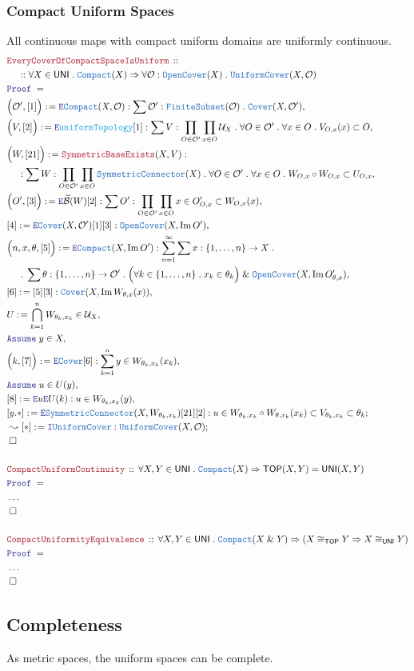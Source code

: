 \documentclass[12pt]{scrartcl}
\newcommand{\TYPE}[1]{\textcolor{NavyBlue}{\mathtt{#1}}}
\newcommand{\FUNC}[1]{\textcolor{Cerulean}{\mathtt{#1}}}
\newcommand{\LOGIC}[1]{\textcolor{Blue}{\mathtt{#1}}}
\newcommand{\THM}[1]{\textcolor{Maroon}{\mathtt{#1}}}
\renewcommand{\.}{\; . \;}
\newcommand{\de}{: \kern 0.1pc =}
\newcommand{\Theorem}[2]{& \THM{#1} \, :: \, #2 \\ & \Proof = \\ }
\newcommand{\NewLine}{\\ & \kern 1pc}
\newcommand{\Page}[1]{ \begin{align*} #1 \end{align*}   }
\newcommand{\NoProof}{ & \ldots \\ \EndProof}
\renewcommand{\And}{\; \& \;}
\newcommand{\Imply}{\Rightarrow}
\DeclareMathOperator*{\im}{Im}
\newcommand{\Finites}{\TYPE{FiniteSubset}}
\newcommand{\Cover}{\TYPE{Cover}}
\newcommand{\Say}[3]{& #1 \de #2 : #3, \\}
\newcommand{\SayIn}[3]{& #1 \de #2 \in #3, \\}
\newcommand{\Conclude}[3]{& #1 \de #2 : #3; \\}
\newcommand{\DeriveConclude}[3]{& \leadsto #1 \de #2 : #3 ; \\}
\newcommand{\AssumeIn}[2]{& \LOGIC{Assume} \; #1 \in #2, \\}
\newcommand{\Intro}{\LOGIC{I}}
\newcommand{\Elim}{\LOGIC{E}}
\newcommand{\QED}{\; \square}
\newcommand{\EndProof}{& \QED \\}
\newcommand{\Proof}{\LOGIC{Proof} \; }
\newcommand{\Compact}{\TYPE{Compact}}
\newcommand{\OpenC}{\TYPE{OpenCover}}
\newcommand{\TOP}{\mathsf{TOP}}
\renewcommand{\U}{\mathcal{U}}
\renewcommand{\O}{\mathcal{O}}
\newcommand{\UNI}{\mathsf{UNI}}
\newcommand{\Sym}{\TYPE{SymmetricConnector}}
\newcommand{\UniCov}{\TYPE{UniformCover}}
\begin{document}
\subsubsection{Compact Uniform Spaces}
All continuous maps with compact uniform domains are uniformly continuous.
\Page{
	\Theorem{EveryCoverOfCompactSpaceIsUniform}
	{
		\NewLine ::		
		\forall X \in \UNI \.
		\Compact(X) \Imply 
		\forall \O : \OpenC(X) \.
		\UniCov(X,\O)
	}
	\Say{\Big(\O',[1]\Big)}{\Elim \Compact(X,\O)}
	{
		\sum \O' : \Finites(\O) \. \Cover(X,\O')
	}
	\Say{\Big(V,[2]\Big)}{\Elim \FUNC{uniformTopology}[1]}
	{
		\sum V : \prod_{O \in \O'} \prod_{x \in O} \U_X \.
		\forall O \in \O' \. \forall x \in O \.    
		V_{O,x}(x) \subset O 
	}
	\Say{\Big(W,[21]\Big)}{\THM{SymmetricBaseExists}(X,V)}
	{
		\NewLine :		
		\sum W : \prod_{O \in \O'} \prod_{x \in O}  \Sym(X) \.
		\forall O \in \O' \. \forall x \in O \.    
		W_{O,x} \circ W_{O,x} \subset U_{O,x}
	}
	\Say{\Big(O',[3]\Big)}{\Elim \widetilde{\mathcal{B}}(W)[2]}
	{
		\sum O' : \prod_{O \in \O'} \prod_{x \in O}  x \in O'_{O,x} \subset W_{O,x}(x)  
	}
	\Say{[4]}{\Elim \Cover(X,\O') [1][3]}{\OpenC(X,\im O')}
	\Say{\Big( n,x,\theta, [5]\Big)}{\Elim \Compact(X,\im O')}
	{
		\sum_{n=1}^\infty 
		\sum x : \{1,\ldots,n\} \to X \. \NewLine \.
		\sum \theta : \{1,\ldots,n\} \to \O' \.
		\Big(\forall k \in \{1,\ldots,n\} \. x_k \in \theta_k \Big) \And
		\OpenC(X,\im O'_{\theta,x})
	}
	\Say{[6]}{[5][3]}{\Cover(X,\im W_{\theta,x}(x))}
	\SayIn{U}{\bigcap^n_{k=1} W_{\theta_k,x_k}}{\U_X}
	\AssumeIn{y}{X}
	\Say{\Big(k,[7]\Big)}{\Elim \Cover [6]}
	{
		\sum^n_{k=1} y \in W_{\theta_k, x_k}(x_k)  
	}
	\AssumeIn{u}{U(y)}
	\Say{[8]}{\Elim u \Elim U (k)}{u \in W_{\theta_k,x_k}(y) }
	\Conclude{[y.*]}{\Elim \Sym(X,W_{\theta_k,x_k})[21][2]}
	{
		u \in W_{\theta_k,x_k} \circ W_{\theta,x_k}(x_k) \subset 
		V_{\theta_k,x_k} \subset  \theta_k	
	}
	\DeriveConclude{[*]}{\Intro \UniCov}
	{
		\UniCov(X,\O)
	}
	\EndProof
	\\
	\Theorem{CompactUniformContinuity}
	{
		\forall X,Y \in \UNI \.
		\Compact(X) \Imply 
		\TOP(X,Y) = \UNI(X,Y)
	}
	\NoProof
	\\
	\Theorem{CompactUniformityEquivalence}
	{
		\forall X,Y \in \UNI \.
		\Compact(X \And Y)
		\Imply
		(X \cong_\TOP Y \Imply X \cong_\UNI Y)
	}
	\NoProof
}
\newpage
\subsection{Completeness}
As metric spaces, the uniform spaces can be complete.
\end{document}
